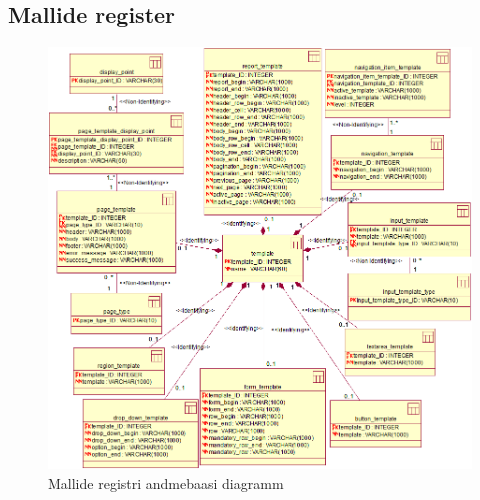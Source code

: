 \documentclass[a4paper,12pt]{article} %
\begin{document}
\subsection*{Mallide register}
\begin{figure}[H]
\centering
\includegraphics[width=\textwidth]{./diagrams/template-db-diagram.png}
\caption{Mallide registri andmebaasi diagramm}
\label{fig_mallide_registri_andmebaasi_diagramm}
\end{figure}
\end{document}
